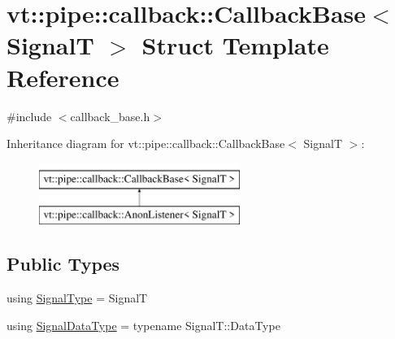 \hypertarget{structvt_1_1pipe_1_1callback_1_1_callback_base}{}\section{vt\+:\+:pipe\+:\+:callback\+:\+:Callback\+Base$<$ SignalT $>$ Struct Template Reference}
\label{structvt_1_1pipe_1_1callback_1_1_callback_base}


{\ttfamily \#include $<$callback\+\_\+base.\+h$>$}

Inheritance diagram for vt\+:\+:pipe\+:\+:callback\+:\+:Callback\+Base$<$ SignalT $>$\+:\begin{figure}[H]
\begin{center}
\leavevmode
\includegraphics[height=2.000000cm]{structvt_1_1pipe_1_1callback_1_1_callback_base}
\end{center}
\end{figure}
\subsection*{Public Types}
\begin{DoxyCompactItemize}
\item 
using \hyperlink{structvt_1_1pipe_1_1callback_1_1_callback_base_ae1d258fb58ce12e88ae0c16bf66e5e60}{Signal\+Type} = SignalT
\item 
using \hyperlink{structvt_1_1pipe_1_1callback_1_1_callback_base_aa1c1fd83b75220a50f6dcd7c1617726e}{Signal\+Data\+Type} = typename Signal\+T\+::\+Data\+Type
\end{DoxyCompactItemize}
